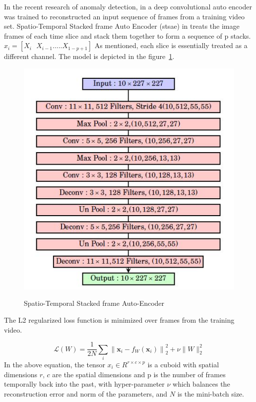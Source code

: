 \documentclass[a4paper,12pt]{report}
\begin{document}
\begin{itemize}
In the recent research of anomaly detection, in \cite{34} a deep convolutional auto encoder was trained to reconstructed an input sequence of frames from a training video set. Spatio-Temporal Stacked frame Auto Encoder (\gls{stsae}) in \cite{34} treats the image frames of each time slice and stack them together to form a sequence of p stacks. $x_i=[X_i\text{ }X_{i-1}\text{.....}X_{1-p+1}]$ As mentioned, each slice is essentially treated as a different channel. The model is depicted in the figure~\ref{fig:STSAE}.

\begin{figure}[H]
\caption{Spatio-Temporal Stacked frame Auto-Encoder}
\includegraphics [scale=1]{images/STSAE.JPG}
\centering
\label{fig:STSAE}
\end{figure}


The L2 regularized loss function is minimized over frames from the training video.

\begin{equation}
    \mathscr { L } ( W ) = \frac { 1 } { 2 N } \sum _ { i } \left\| \mathbf { x } _ { i } - f _ { W } \left( \mathbf { x } _ { i } \right) \right\| _ { 2 } ^ { 2 } + \nu \| W \| _ { 2 } ^ { 2 }
\end{equation}
In the above equation, the tensor $x_i \in R^{r\times c\times p}$ is a cuboid with spatial dimensions $r$, $c$ are the spatial dimensions and p is the number of frames temporally back into the past, with hyper-parameter
$\nu$ which balances the reconstruction error and norm of the parameters, and $N$ is the mini-batch size.


\end{itemize}
\end{document}
